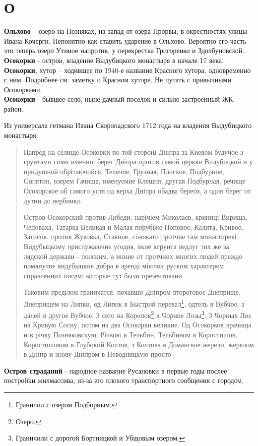 \chapter*{О}

\textbf{Ольхово} – озеро на Позняках, на запад от озера Прорвы, в окрестностях улицы Ивана Кочерги. Непонятно как ставить ударение в Ольхово. Вероятно его часть это теперь озеро Утиное напротив, у перекрестка Григоренко и Здолбуновской.\\


\textbf{Осокорки} - остров, владение Выдубицкого монастыря в начале 17 века.\\

\textbf{Осокорки}, хутор – ходившее по 1940-е название Красного хутора, одновременно с ним. Подробнее см. заметку о Красном хуторе. Не путать с привычными Осокорками.\\

\textbf{Осокорки} - бывшее село, ныне дачный поселок и сильно застроенный ЖК район.

Из универсала гетмана Ивана Скоропадского 1712 года на владения Выдубицкого монастыря:

\begin{quotation}
Напрод на селище Осокорки по той стороні Дніпра за Киевом будучое з грунтами сими именно: берег Дніпра против самой церкви Вилубицкой и у придушной обрітаючийся, Телячое, Грузная, Плоское, Подбурное, Синятин, озерем Гачища, именуемие Клешня, другая Подбурная, речище Осокорское об самого устя од верха Дніпра обадва береги, а один берег от дутни до вербника.

Остров Осокорский против Либеди, нарічіем Миколаев, криниці Вирища, Чеповаха, Татарка Великая и Малая порубіже Поповое, Калита, Кривое, Затисок, против Жуковка, Ставное, сіножати протчие там монастиреві Видубыцкому прислужаючие угодия, якие кгрунта ведлуг тих же за лядской держави - полским, а инние от протчиих многих людей прежде помянутие видубыцкие добра в аренді міючих руским характером справленних писем: которые тут были презентовани.

Таковим преділом граничатся, почавши Дніпром второговое Днеприще. Днеприщем на Липки, од Липок в Быстрий перевал\footnote{Граничил с озером Подборным.}, одтель в Вубчое, а далей в другое Вубчое. З сего на Коропов\footnote{Озеро.} в Чорние Лозы\footnote{Граничили с дорогой Бортницкой и Убщовым озером.}. З Чорных Лоз на Кривую Сосну, потом на два Осокорки великие. Од Осокорков врачища и в річку Позняковскую. Річкою в Тельбин, Тельбином в Коростишов, Коростишовом в Глубокий Колтов, з Колтова в Доманское жерело, жерелом в Дніпр и знову Дніпром в Неводницкую просто.
\end{quotation}


\textbf{Остров страданий} - народное название Русановки в первые годы послее постройки жилмассива, из-за его плохого транспортного сообщения с городом.\\


